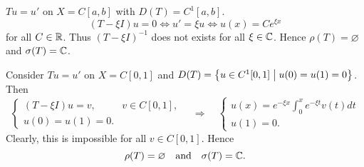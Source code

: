 \begin{example}
    $Tu = u'$ on $X = C[a,b]$ with $D(T) = C^1[a,b]$. 
    \begin{equation*}
        (T-\xi I)u = 0 \Leftrightarrow u' = \xi u \Leftrightarrow u(x) = Ce^{\xi x}
    \end{equation*}
    for all $C\in\mathbb{R}$. Thus $(T-\xi I)^{-1}$ does not exists for all $\xi\in\mathbb{C}$. 
    Hence $\rho(T) = \varnothing$ and $\sigma(T) = \mathbb{C}$.
\end{example}

\begin{example}
    Consider $Tu = u'$ on $X = C[0,1]$ and $D(T) = \left\{ u\in C^1[0,1] \;\middle\vert\; u(0) = u(1) = 0 \right\}$. 
    Then 
    \begin{equation*}
        \begin{cases}
            (T-\xi I)u = v, & v\in C[0,1], \\
            u(0) = u(1) = 0.
        \end{cases}\quad\Rightarrow\quad 
        \begin{cases}
            u(x) = e^{-\xi x}\int_0^x e^{-\xi t}v(t)dt \\ 
            u(1) = 0.
        \end{cases}
    \end{equation*}
    Clearly, this is impossible for all $v\in C[0,1]$. Hence 
    \begin{equation*}
        \rho(T) = \varnothing \quad\text{and}\quad \sigma(T) = \mathbb{C}.
    \end{equation*}
\end{example}

